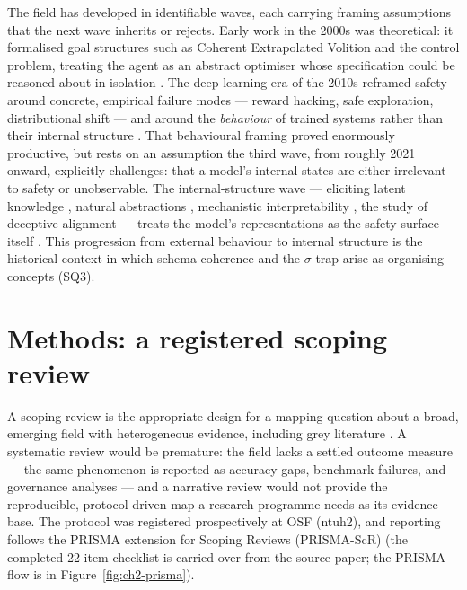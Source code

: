The field has developed in identifiable waves, each carrying framing assumptions that
the next wave inherits or rejects. Early work in the 2000s was theoretical: it
formalised goal structures such as Coherent Extrapolated Volition \citep{yudkowsky2004cev}
and the control problem, treating the agent as an abstract optimiser whose specification
could be reasoned about in isolation \citep{bostrom2014superintelligence,
soares2015corrigibility}. The deep-learning era of the 2010s reframed safety around
concrete, empirical failure modes --- reward hacking, safe exploration, distributional
shift --- and around the \emph{behaviour} of trained systems rather than their internal
structure \citep{amodei2016concrete,hendrycks2021unsolved,hubinger2019risks}. That
behavioural framing proved enormously productive, but rests on an assumption the third
wave, from roughly 2021 onward, explicitly challenges: that a model's internal states
are either irrelevant to safety or unobservable. The internal-structure wave ---
eliciting latent knowledge \citep{christiano2021elk}, natural abstractions
\citep{wentworth2020natural}, mechanistic interpretability \citep{bereska2024mechanistic},
the study of deceptive alignment \citep{hubinger2024sleeper} --- treats the model's
representations as the safety surface itself \citep{huvard2023notion}. This progression
from external behaviour to internal structure is the historical context in which schema
coherence and the $\sigma$-trap arise as organising concepts (SQ3).

\section{Methods: a registered scoping review}

A scoping review is the appropriate design for a mapping question about a broad,
emerging field with heterogeneous evidence, including grey literature
\citep{arksey2005scoping,levac2010scoping,tricco2018prismascr}. A systematic review
would be premature: the field lacks a settled outcome measure --- the same phenomenon
is reported as accuracy gaps, benchmark failures, and governance analyses --- and a
narrative review would not provide the reproducible, protocol-driven map a research
programme needs as its evidence base. The protocol was registered prospectively at
OSF (ntuh2), and reporting follows the PRISMA extension for Scoping Reviews
(PRISMA-ScR) \citep{tricco2018prismascr} (the completed 22-item checklist is carried
over from the source paper; the PRISMA flow is in Figure~\ref{fig:ch2-prisma}).


